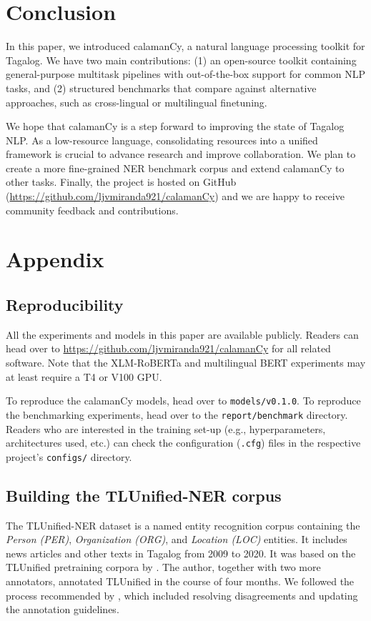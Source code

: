 \documentclass[11pt]{article}
\begin{document}
\section{Conclusion}

In this paper, we introduced calamanCy, a natural language processing toolkit for Tagalog.
We have two main contributions: (1) an open-source toolkit containing general-purpose multitask pipelines with out-of-the-box support for common NLP tasks, and
(2) structured benchmarks that compare against alternative approaches, such as cross-lingual or multilingual finetuning. 

We hope that calamanCy is a step forward to improving the state of Tagalog NLP. 
As a low-resource language, consolidating resources into a unified framework is crucial to advance research and improve collaboration.
We plan to create a more fine-grained NER benchmark corpus and extend calamanCy to other tasks.
Finally, the project is hosted on GitHub (\url{https://github.com/ljvmiranda921/calamanCy}) and we are happy to receive community feedback and contributions.

\section*{Appendix}

\subsection*{Reproducibility}

All the experiments and models in this paper are available publicly. 
Readers can head over to \url{https://github.com/ljvmiranda921/calamanCy} for all related software.
Note that the XLM-RoBERTa and multilingual BERT experiments may at least require a T4 or V100 GPU.

To reproduce the calamanCy models, head over to \texttt{models/v0.1.0}.
To reproduce the benchmarking experiments, head over to the \texttt{report/benchmark} directory.
Readers who are interested in the training set-up (e.g., hyperparameters, architectures used, etc.) can check the configuration (\texttt{.cfg}) files in the respective project's \texttt{configs/} directory.

\subsection*{Building the TLUnified-NER corpus}

The TLUnified-NER dataset is a named entity recognition corpus containing the \textit{Person (PER)}, \textit{Organization (ORG)}, and \textit{Location  (LOC)} entities.
It includes news articles and other texts in Tagalog from 2009 to 2020.
It was based on the TLUnified pretraining corpora by \cite{Cruz2021ImprovingLL}.
The author, together with two more annotators, annotated TLUnified in the course of four months.
We followed the process recommended by \citet{Reiter2017HT}, which included resolving disagreements and updating the annotation guidelines.
\end{document}
